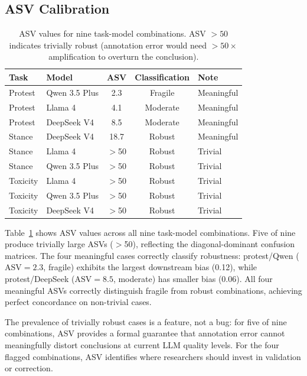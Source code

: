 \documentclass[11pt]{article}
\begin{document}
\subsection{ASV Calibration}

\begin{table}[t]
\centering
\caption{ASV values for nine task-model combinations. ASV $> 50$ indicates trivially robust (annotation error would need $> 50\times$ amplification to overturn the conclusion).}
\label{tab:asv-empirical}
\small
\begin{tabular}{llccl}
\toprule
Task & Model & ASV & Classification & Note \\
\midrule
Protest & Qwen 3.5 Plus & 2.3 & Fragile & Meaningful \\
Protest & Llama 4 & 4.1 & Moderate & Meaningful \\
Protest & DeepSeek V4 & 8.5 & Moderate & Meaningful \\
Stance & DeepSeek V4 & 18.7 & Robust & Meaningful \\
Stance & Llama 4 & $>$50 & Robust & Trivial \\
Stance & Qwen 3.5 Plus & $>$50 & Robust & Trivial \\
Toxicity & Llama 4 & $>$50 & Robust & Trivial \\
Toxicity & Qwen 3.5 Plus & $>$50 & Robust & Trivial \\
Toxicity & DeepSeek V4 & $>$50 & Robust & Trivial \\
\bottomrule
\end{tabular}
\end{table}

Table~\ref{tab:asv-empirical} shows ASV values across all nine task-model combinations.
Five of nine produce trivially large ASVs ($>$50), reflecting the diagonal-dominant confusion matrices.
The four meaningful cases correctly classify robustness: protest/Qwen ($\text{ASV} = 2.3$, fragile) exhibits the largest downstream bias (0.12), while protest/DeepSeek ($\text{ASV} = 8.5$, moderate) has smaller bias (0.06).
All four meaningful ASVs correctly distinguish fragile from robust combinations, achieving perfect concordance on non-trivial cases.

The prevalence of trivially robust cases is a feature, not a bug: for five of nine combinations, ASV provides a formal guarantee that annotation error cannot meaningfully distort conclusions at current LLM quality levels.
For the four flagged combinations, ASV identifies where researchers should invest in validation or correction.
\end{document}

